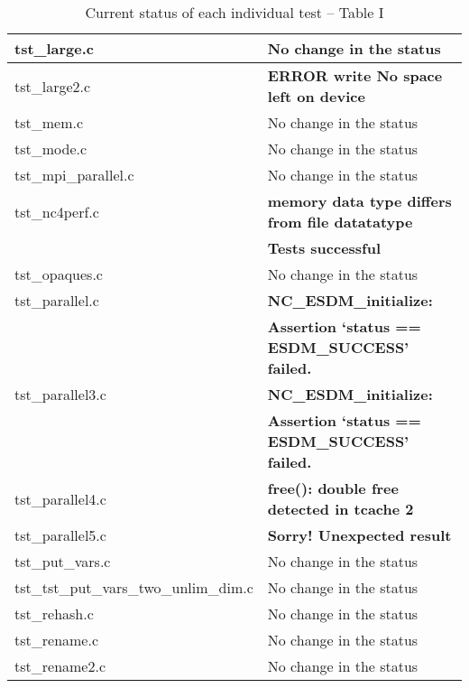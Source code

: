 \begin{table}[H]
\begin{tabular}{|l|l|}
tst\_large.c            &   No change in the status            \\ \hline
tst\_large2.c           &   \textbf{ERROR write No space left on device}            \\ \hline
tst\_mem.c              &   No change in the status            \\ \hline
tst\_mode.c             &   No change in the status            \\ \hline
tst\_mpi\_parallel.c    &   No change in the status            \\ \hline
tst\_nc4perf.c          &   \textbf{memory data type differs from file datatatype}            \\
          &  \textbf{Tests successful}             \\ \hline
tst\_opaques.c          &   No change in the status             \\ \hline
tst\_parallel.c         &   \textbf{NC\_ESDM\_initialize:} \\
& \textbf{Assertion `status == ESDM\_SUCCESS' failed.}             \\ \hline
tst\_parallel3.c        &   \textbf{NC\_ESDM\_initialize:} \\
& \textbf{Assertion `status == ESDM\_SUCCESS' failed.}             \\ \hline
tst\_parallel4.c        &   \textbf{free(): double free detected in tcache 2}             \\ \hline
tst\_parallel5.c        &   \textbf{Sorry! Unexpected result}             \\ \hline
tst\_put\_vars.c        &   No change in the status             \\ \hline
tst\_tst\_put\_vars\_two\_unlim\_dim.c &  No change in the status  \\ \hline
tst\_rehash.c           &   No change in the status             \\ \hline
tst\_rename.c           &   No change in the status             \\ \hline
tst\_rename2.c          &   No change in the status             \\ \hline
\hline
\end{tabular}
\caption{\label{tab:nc_test4_status_21} Current status of each individual test -- Table I}
\end{table}

